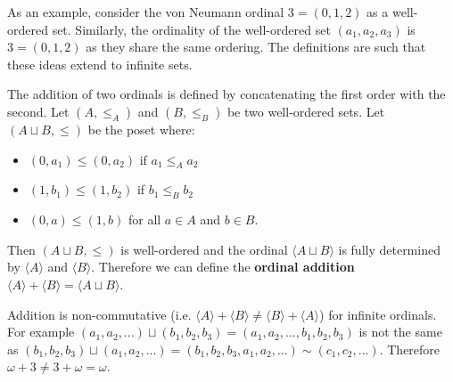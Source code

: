 \documentclass{bareminimum}
\def\ordeq{\sim}
\begin{document}
\begin{remark}
	As an example, consider the von Neumann ordinal $3 = (0, 1, 2)$ as a well-ordered set. Similarly, the ordinality of the well-ordered set $(a_1, a_2, a_3)$ is $3 = (0, 1, 2)$ as they share the same ordering. The definitions are such that these ideas extend to infinite sets.
\end{remark}

\begin{defn}
	The addition  of two ordinals is defined by concatenating the first order with the second. Let $(A, \leq_A)$ and $(B, \leq_B)$ be two well-ordered sets. Let $(A \sqcup B, \leq)$ be the poset where:
	\begin{itemize}
		\item $(0, a_1) \leq (0, a_2)$ if $a_1 \leq_A a_2$
		\item $(1, b_1) \leq (1, b_2)$ if $b_1 \leq_B b_2$
		\item $(0, a) \leq (1, b)$ for all $a \in A$ and $b \in B$.  	
	\end{itemize}
	Then $(A \sqcup B, \leq)$ is well-ordered and the ordinal $\langle A \sqcup B \rangle$ is fully determined by $\langle A \rangle$ and $\langle B \rangle$. Therefore we can define the \textbf{ordinal addition} $\langle A \rangle + \langle B \rangle =  \langle A \sqcup B \rangle$.
\end{defn}


\begin{remark}
	Addition is non-commutative (i.e. $\langle A \rangle + \langle B \rangle \neq \langle B \rangle + \langle A \rangle$) for infinite ordinals. For example $(a_1, a_2, ...) \sqcup (b_1, b_2, b_3) = (a_1, a_2, ..., b_1, b_2, b_3)$ is not the same as $(b_1, b_2, b_3) \sqcup (a_1, a_2, ...) = (b_1, b_2, b_3, a_1, a_2, ...) \ordeq (c_1, c_2, ...)$. Therefore $\omega + 3 \neq 3 + \omega = \omega$.
\end{remark}
\end{document}
